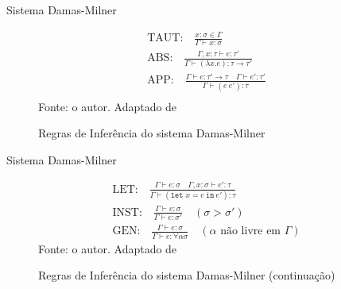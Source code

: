 \begin{frame}{Sistema Damas-Milner}
    \begin{figure}[ht!]
        \caption{Regras de Inferência do sistema Damas-Milner}
        \centering
        \[
            \begin{array}{c}
                \text{TAUT:} \quad \displaystyle\frac{x : \sigma \in \Gamma}{\Gamma \vdash x : \sigma}                                               \\[25pt]

                \text{ABS:} \quad \displaystyle\frac{\Gamma, x : \tau \vdash e : \tau'}{\Gamma \vdash (\lambda x. e) : \tau \to \tau'}               \\[25pt]

                \text{APP:} \quad \displaystyle\frac{\Gamma \vdash e : \tau' \to \tau \quad \Gamma \vdash e' : \tau'}{\Gamma \vdash (e \ e') : \tau} \\[25pt]
            \end{array}
        \]
        \small{Fonte: o autor. Adaptado de~\cite{DAMAS1982}}
    \end{figure}
\end{frame}

\begin{frame}{Sistema Damas-Milner}
    \begin{figure}[ht!]
        \caption{Regras de Inferência do sistema Damas-Milner (continuação)}
        \centering
        \[
            \begin{array}{c}
                \text{LET:} \quad \displaystyle\frac{\Gamma \vdash e : \sigma \quad \Gamma, x : \sigma \vdash e' : \tau}{\Gamma \vdash (\texttt{let } x = e \ \texttt{in} \ e') : \tau} \\[25pt]

                \text{INST:} \quad \displaystyle\frac{\Gamma \vdash e : \sigma}{\Gamma \vdash e : \sigma'} \quad (\sigma > \sigma')                                                     \\[25pt]

                \text{GEN:} \quad \displaystyle\frac{\Gamma \vdash e : \sigma}{\Gamma \vdash e : \forall \alpha \sigma} \quad (\alpha \text{ não livre em } \Gamma)
            \end{array}
        \]
        \small{Fonte: o autor. Adaptado de~\cite{DAMAS1982}}
    \end{figure}
\end{frame}
